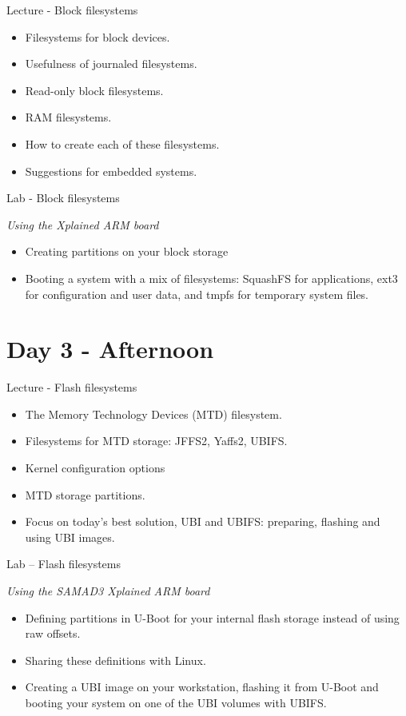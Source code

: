\documentclass[a4paper,12pt,obeyspaces,spaces,hyphens]{article}
\begin{document}
\feagendatwocolumn
{Lecture - Block filesystems}
{
  \begin{itemize}
  \item Filesystems for block devices.
  \item Usefulness of journaled filesystems.
  \item Read-only block filesystems.
  \item RAM filesystems.
  \item How to create each of these filesystems.
  \item Suggestions for embedded systems.
  \end{itemize}
}
{Lab - Block filesystems}
{
  {\em Using the Xplained ARM board}
  \begin{itemize}
  \item Creating partitions on your block storage
  \item Booting a system with a mix of filesystems: SquashFS for
	applications, ext3 for configuration and user data, and
	tmpfs for temporary system files.
  \end{itemize}
}

\section{Day 3 - Afternoon}

\feagendatwocolumn
{Lecture - Flash filesystems}
{
  \begin{itemize}
  \item The Memory Technology Devices (MTD) filesystem.
  \item Filesystems for MTD storage: JFFS2, Yaffs2, UBIFS.
  \item Kernel configuration options
  \item MTD storage partitions.
  \item Focus on today's best solution, UBI and UBIFS:
	preparing, flashing and using UBI images.
  \end{itemize}
}
{Lab – Flash filesystems}
{
  {\em Using the SAMAD3 Xplained ARM board}
  \begin{itemize}
  \item Defining partitions in U-Boot for your internal
        flash storage instead of using raw offsets.
  \item Sharing these definitions with Linux.
  \item Creating a UBI image on your workstation, flashing
        it from U-Boot and booting your system on one of
        the UBI volumes with UBIFS. 
  \end{itemize}
}
\end{document}
